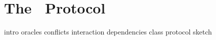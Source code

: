 \section{The \kachina\ Protocol}
\label{sec:kachina}

{intro}
{oracles}
{conflicts}
{interaction}
{dependencies}
{class}
{protocol}
{sketch}

